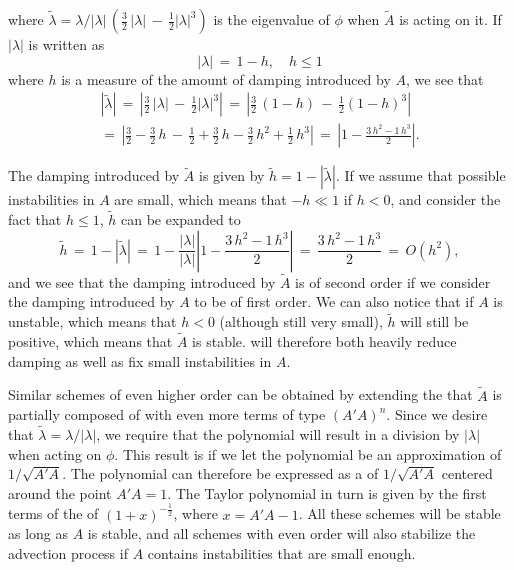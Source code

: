 %
where $\tilde{\lambda} = \lambda/|\lambda|\,\left(\tfrac{3}{2}\,|\lambda| \,-\, \tfrac{1}{2}|\lambda|^3\right)$ is the eigenvalue of $\phi$ when $\tilde{A}$ is acting on it. If $|\lambda|$ is written as
%
\begin{equation}
|\lambda| \,=\, 1 - h, \quad h \leq 1
\end{equation}
%
where $h$ is a measure of the amount of damping introduced by $A$, we see that
%
\begin{equation}
\renewcommand*{\arraystretch}{1.5}
\begin{array}{c}
|\tilde{\lambda}| \,=\, \left|\tfrac{3}{2}\,|\lambda| \,-\, \tfrac{1}{2}|\lambda|^3\right| \,=\, \left|\tfrac{3}{2}\,(1-h) \,-\, \tfrac{1}{2}(1-h)^3\right| \\
=\, \left|\tfrac{3}{2}-\tfrac{3}{2}\,h \,-\, \tfrac{1}{2} + \tfrac{3}{2}\,h - \tfrac{3}{2}\,h^2 + \tfrac{1}{2}\,h^3\right| \,=\, \left|1 - \displaystyle\frac{3\,h^2 - 1\,h^3}{2}\right|.
\end{array}
\end{equation}

The damping introduced by $\tilde{A}$ is given by $\tilde{h} = 1 - |\tilde{\lambda}|$. If we assume that possible instabilities in $A$ are small, which means that $-h \ll 1$ if $h < 0$, and consider the fact that $h \leq 1$, $\tilde{h}$ can be expanded to
%
\begin{equation}
\tilde{h} \,=\, 1 - |\tilde{\lambda}| \,=\, 1 - \frac{|\lambda|}{|\lambda|}\left|1 - \displaystyle\frac{3\,h^2 - 1\,h^3}{2}\right| \,=\, \displaystyle\frac{3\,h^2 - 1\,h^3}{2} \,=\, O(h^2),
\end{equation}
%
and we see that the damping introduced by $\tilde{A}$ is of second order if we consider the damping introduced by $A$ to be of first order. We can also notice that if $A$ is unstable, which means that $h < 0$ (although still very small), $\tilde{h}$ will still be positive, which means that $\tilde{A}$ is stable. \BFECC will therefore both heavily reduce damping as well as fix small instabilities in $A$.

Similar schemes of even higher order can be obtained by extending the \polynomial that $\tilde{A}$ is partially composed of with even more terms of type $(A'A)^n$. Since we desire that $\tilde{\lambda} = \lambda/|\lambda|$, we require that the polynomial will result in a division by $|\lambda|$ when acting on $\phi$. This result is \approximated if we let the polynomial be an approximation of $1/\sqrt{A'A}$. The polynomial can therefore be expressed as a  of $1/\sqrt{A'A}$ centered around the point $A'A = 1$. The Taylor polynomial in turn is given by the first terms of the  of $(1+x)^{-\frac{1}{2}}$, where $x = A'A - 1$. All these schemes will be stable as long as $A$ is stable, and all schemes with even order will also stabilize the advection process if $A$ contains instabilities that are small enough.

